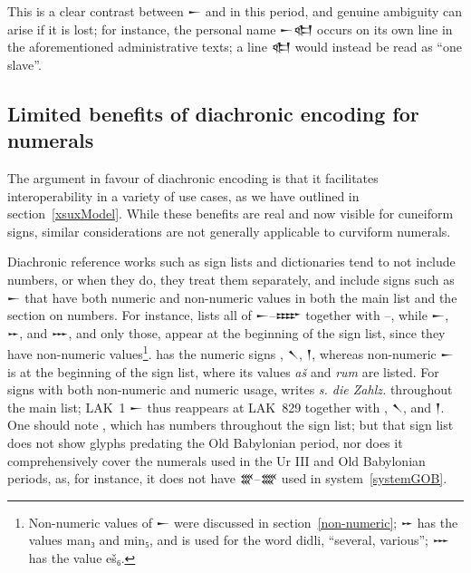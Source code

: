 \documentclass[10pt, a4paper, twoside]{article}
\newcommand\oneAšC{{\proposalfont\symbol{"12550}}} %
\newcommand\nineAšC{{\proposalfont\symbol{"12558}}} %
\begin{document}
This is a clear contrast between {\xsuxfont 𒀸} and {\oneAšC} in this period,
and genuine ambiguity can arise if it is lost; for instance, the personal name
{\xsuxfont 𒀸𒊕} occurs on its own line in the aforementioned administrative texts;
a line {\oneAšC\xsuxfont 𒊕} would instead be read as ``one slave''.

\subsection{Limited benefits of diachronic encoding for numerals}
\label{limitedBenefitsOfDiachrony}
The argument in favour of diachronic encoding is that it facilitates
interoperability in a variety of use cases,
as we have outlined in section~\ref{xsuxModel}.
While these benefits are real and now visible for cuneiform signs,
similar considerations are not generally applicable to curviform numerals.

Diachronic reference works such as sign lists and dictionaries tend to not include numbers,
or when they do, they treat them separately, and include signs such as {\xsuxfont 𒀸}
that have both numeric and non-numeric values in both the main list and the section on numbers.
For instance, \cite[123 \psqq]{KWU} lists all of {\xsuxfont 𒀸}--{\xsuxfont 𒐇} together with
{\oneAšC}--{\nineAšC},
while {\xsuxfont 𒀸}, {\xsuxfont 𒐀}, and {\xsuxfont 𒐁}, and only those, appear at the beginning of the sign list,
since they have non-numeric values\footnote{Non-numeric values of {\xsuxfont 𒀸} were discussed in
section~\ref{non-numeric};
{\xsuxfont 𒐀} has the values man₃ and min₅, and is used for the word didli, ``several, various'';
{\xsuxfont 𒐁} has the value eš₆.}.
\cite[58]{PTACE} has the numeric signs {\oneAšC}, {\xsuxfont 𒀹}, {\xsuxfont 𒁹},
whereas non-numeric {\xsuxfont 𒀸} is at the beginning of the sign list,
where its values \emph{aš} and \emph{rum} are listed.
For signs with both non-numeric and numeric usage, \cite{LAK} writes \emph{\textgerman{s. die Zahlz.}}
throughout the main list; LAK~1 {\xsuxfont 𒀸} thus reappears at LAK~829 together with
{\oneAšC}, {\xsuxfont 𒀹}, and {\xsuxfont 𒁹}.
One should note \cite{MZL}, which has numbers throughout the sign list;
but that sign list does not show glyphs predating the Old Babylonian period,
nor does it comprehensively cover the numerals used in the Ur III and Old Babylonian
periods, as, for instance, it does not have {\xsuxfont 𒐒}--{\xsuxfont 𒐔} used in
system~\ref{systemGOB}.
\end{document}

